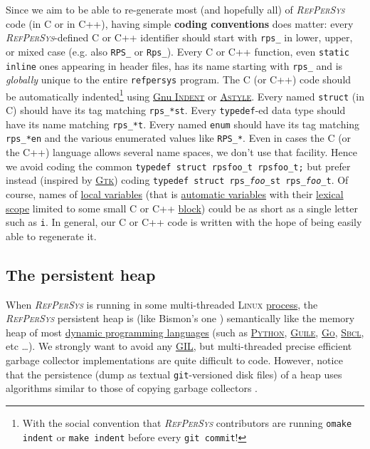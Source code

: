 \documentclass{IEEEtran}
\newcommand{\RefPerSys}{{\textit{\textsc{RefPerSys}}}}
\begin{document}
 Since we aim to be able to re-generate most (and hopefully all) of
 {\RefPerSys} code (in C or in C++), having simple \textbf{coding
   conventions} does matter: every \RefPerSys-defined C or C++
 identifier should start with \texttt{rps\_} in lower, upper, or mixed
 case (e.g. also \texttt{RPS\_} or \texttt{Rps\_}). Every C or C++
 function, even \texttt{static inline} ones appearing in header files,
 has its name starting with \texttt{rps\_} and is \emph{globally}
 unique to the entire \texttt{refpersys} program. The C (or C++) code
 should be automatically indented\footnote{With the social convention
 that {\RefPerSys} contributors are running \texttt{omake indent} or
 \texttt{make indent} before every \texttt{git commit}!} using
 \href{https://www.gnu.org/software/indent/}{Gnu \textsc{Indent}} or
 \href{http://astyle.sourceforge.net/}{\textsc{Astyle}}. Every named
 \texttt{struct} (in C) should have its tag matching
 \texttt{rps\_*st}. Every \texttt{typedef}-ed data type should have
 its name matching \texttt{rps\_*t}. Every named \texttt{enum} should
 have its tag matching \texttt{rps\_*en} and the various enumerated
 values like \texttt{RPS\_*}. Even in cases the C (or the C++)
 language allows several name spaces, we don't use that facility. 
 Hence we avoid coding the
 common \texttt{typedef struct rpsfoo\_t rpsfoo\_t;} but prefer
 instead (inspired by \href{http://gtk.org}{\textsc{Gtk}}) coding
 \texttt{typedef struct rps\_\textit{foo}\_st
   rps\_\textit{foo}\_t}. Of course, names of
 \href{https://en.wikipedia.org/wiki/Local\_variable}{local variables}
 (that is
 \href{https://en.wikipedia.org/wiki/Automatic_variable}{automatic
   variables} with their
 \href{https://en.wikipedia.org/wiki/Scope\_(computer\_science)\#Lexical\_scoping}{lexical
   scope} limited to some small C or C++
 \href{https://en.wikipedia.org/wiki/Block\_(programming)}{block})
 could be as short as a single letter such as \texttt{i}. In general,
 our C or C++ code is written with the hope of being easily able to
 regenerate it.


\subsection{The persistent heap}
\label{subsec:persistheap}

When {\RefPerSys} is running in some multi-threaded \textsc{Linux}
\href{https://en.wikipedia.org/wiki/Process\_(computing)}{process},
the {\RefPerSys} persistent heap is (like Bismon's one
\cite{Starynkevitch:2019:bismon-draft}) semantically like the memory
heap of most
\href{https://en.wikipedia.org/wiki/Dynamic\_programming\_language}{dynamic
  programming languages} (such as
\href{https://python.org/}{\textsc{Python}},
\href{https://www.gnu.org/software/guile/}{\textsc{Guile}},
\href{https://golang.org/}{\textsc{Go}},
\href{http://sbcl.org/}{\textsc{Sbcl}}, etc \ldots).
  We strongly want
to avoid any
\href{https://en.wikipedia.org/wiki/Global\_interpreter\_lock}{GIL},
but multi-threaded precise efficient garbage collector implementations
are quite difficult to code. However, notice that the persistence
(dump as textual \texttt{git}-versioned disk files) of a heap uses
algorithms similar to those of copying garbage collectors
\cite{wilson:1992:uniprocessorgc, jones:2016:gchandbook}.
\end{document}
